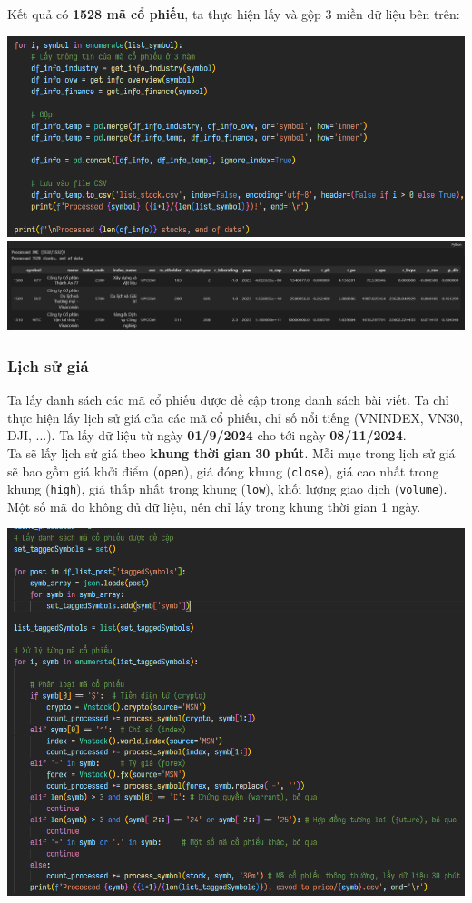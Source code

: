 Kết quả có \textbf{1528 mã cổ phiếu}, ta thực hiện lấy và gộp 3 miền dữ liệu bên trên:
\begin{center}
    \centering
    \includegraphics[width=0.8\linewidth]{images/code-1.15-crawlstockmerge.png}
    \includegraphics[width=1\linewidth]{images/code-1.16-crawlstockresult.png}
\end{center}

\subsubsection*{Lịch sử giá}
Ta lấy danh sách các mã cổ phiếu được đề cập trong danh sách bài viết. Ta chỉ thực hiện lấy lịch sử giá của các mã cổ phiếu, chỉ số nổi tiếng (VNINDEX, VN30, DJI, ...). Ta lấy dữ liệu từ ngày \textbf{01/9/2024} cho tới ngày \textbf{08/11/2024}.\\

Ta sẽ lấy lịch sử giá theo \textbf{khung thời gian 30 phút}. Mỗi mục trong lịch sử giá sẽ bao gồm giá khởi điểm (\texttt{open}), giá đóng khung (\texttt{close}), giá cao nhất trong khung (\texttt{high}), giá thấp nhất trong khung (\texttt{low}), khối lượng giao dịch (\texttt{volume}). Một số mã do không đủ dữ liệu, nên chỉ lấy trong khung thời gian 1 ngày.

\begin{center}
    \centering
    \includegraphics[width=1\linewidth]{images/code-1.17-crawlhistory.png}
\end{center}

